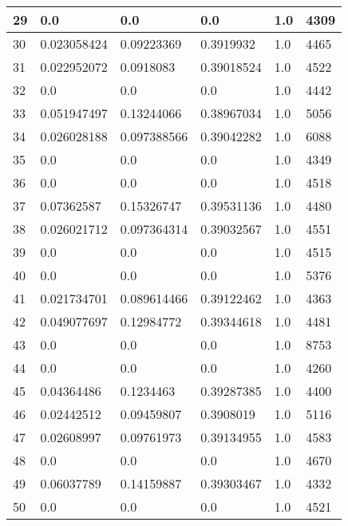 \begin{longtable}{|l|l|l|l|l|l|}
29 & 0.0 & 0.0 & 0.0 & 1.0 & 4309 \\ \hline 
30 & 0.023058424 & 0.09223369 & 0.3919932 & 1.0 & 4465 \\ \hline 
31 & 0.022952072 & 0.0918083 & 0.39018524 & 1.0 & 4522 \\ \hline 
32 & 0.0 & 0.0 & 0.0 & 1.0 & 4442 \\ \hline 
33 & 0.051947497 & 0.13244066 & 0.38967034 & 1.0 & 5056 \\ \hline 
34 & 0.026028188 & 0.097388566 & 0.39042282 & 1.0 & 6088 \\ \hline 
35 & 0.0 & 0.0 & 0.0 & 1.0 & 4349 \\ \hline 
36 & 0.0 & 0.0 & 0.0 & 1.0 & 4518 \\ \hline 
37 & 0.07362587 & 0.15326747 & 0.39531136 & 1.0 & 4480 \\ \hline 
38 & 0.026021712 & 0.097364314 & 0.39032567 & 1.0 & 4551 \\ \hline 
39 & 0.0 & 0.0 & 0.0 & 1.0 & 4515 \\ \hline 
40 & 0.0 & 0.0 & 0.0 & 1.0 & 5376 \\ \hline 
41 & 0.021734701 & 0.089614466 & 0.39122462 & 1.0 & 4363 \\ \hline 
42 & 0.049077697 & 0.12984772 & 0.39344618 & 1.0 & 4481 \\ \hline 
43 & 0.0 & 0.0 & 0.0 & 1.0 & 8753 \\ \hline 
44 & 0.0 & 0.0 & 0.0 & 1.0 & 4260 \\ \hline 
45 & 0.04364486 & 0.1234463 & 0.39287385 & 1.0 & 4400 \\ \hline 
46 & 0.02442512 & 0.09459807 & 0.3908019 & 1.0 & 5116 \\ \hline 
47 & 0.02608997 & 0.09761973 & 0.39134955 & 1.0 & 4583 \\ \hline 
48 & 0.0 & 0.0 & 0.0 & 1.0 & 4670 \\ \hline 
49 & 0.06037789 & 0.14159887 & 0.39303467 & 1.0 & 4332 \\ \hline 
50 & 0.0 & 0.0 & 0.0 & 1.0 & 4521 \\ \hline 
\end{longtable}